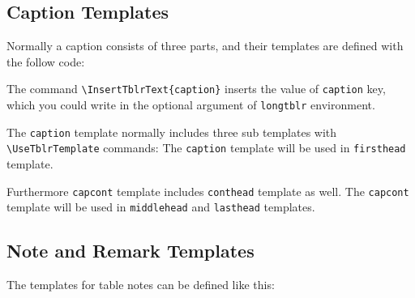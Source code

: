 \documentclass[oneside]{book}
\begin{document}
\begin{codehigh}
\end{codehigh}

\subsection{Caption Templates}

Normally a caption consists of three parts, and their templates are defined with the follow code:

\begin{codehigh}
\end{codehigh}

The command \verb!\InsertTblrText{caption}! inserts the value of \verb!caption! key,
which you could write in the optional argument of \verb!longtblr! environment.

The \verb!caption! template normally includes three sub templates with \verb!\UseTblrTemplate! commands:
The \verb!caption! template will be used in \verb!firsthead! template.

\begin{codehigh}
\end{codehigh}

Furthermore \verb!capcont! template includes \verb!conthead! template as well.
The \verb!capcont! template will be used in \verb!middlehead! and \verb!lasthead! templates.

\begin{codehigh}
\end{codehigh}

\subsection{Note and Remark Templates}

The templates for table notes can be defined like this:
\end{document}
